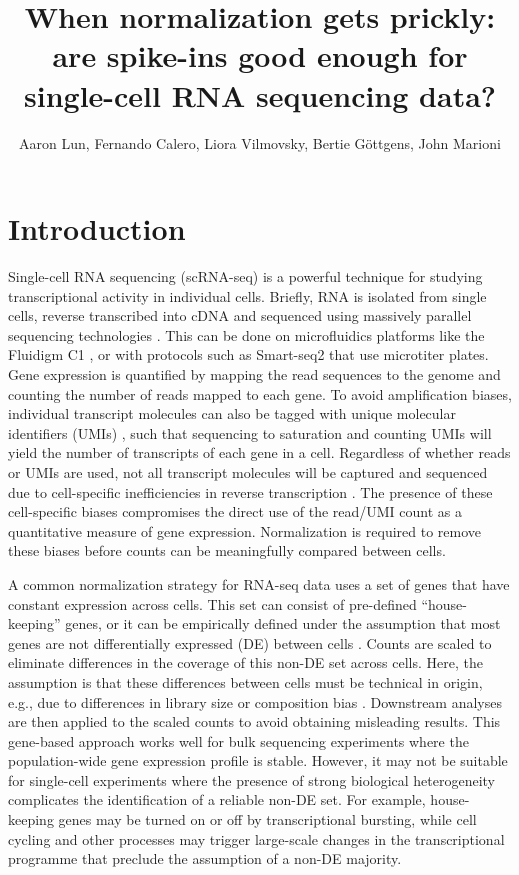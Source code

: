 \documentclass{article}
\title{When normalization gets prickly: are spike-ins good enough for single-cell RNA sequencing data?}
\author{Aaron Lun, Fernando Calero, Liora Vilmovsky, Bertie G\"ottgens, John Marioni}
\begin{document}
\maketitle

\section{Introduction}
Single-cell RNA sequencing (scRNA-seq) is a powerful technique for studying transcriptional activity in individual cells.
Briefly, RNA is isolated from single cells, reverse transcribed into cDNA and sequenced using massively parallel sequencing technologies \cite{shapiro2013singlecell}.
This can be done on microfluidics platforms like the Fluidigm C1 \cite{pollen2014lowcoverage}, or with protocols such as Smart-seq2 \cite{picelli2014full} that use microtiter plates.
Gene expression is quantified by mapping the read sequences to the genome and counting the number of reads mapped to each gene.
To avoid amplification biases, individual transcript molecules can also be tagged with unique molecular identifiers (UMIs) \cite{islam2014quantitative}, such that sequencing to saturation and counting UMIs will yield the number of transcripts of each gene in a cell.
Regardless of whether reads or UMIs are used, not all transcript molecules will be captured and sequenced due to cell-specific inefficiencies in reverse transcription \cite{stegle2015computational}.
The presence of these cell-specific biases compromises the direct use of the read/UMI count as a quantitative measure of gene expression.
Normalization is required to remove these biases before counts can be meaningfully compared between cells.

A common normalization strategy for RNA-seq data uses a set of genes that have constant expression across cells.
This set can consist of pre-defined ``house-keeping'' genes, or it can be empirically defined under the assumption that most genes are not differentially expressed (DE) between cells \cite{lun2016pooling,anders2010differential,robinson2010tmm}.
Counts are scaled to eliminate differences in the coverage of this non-DE set across cells.
Here, the assumption is that these differences between cells must be technical in origin, e.g., due to differences in library size or composition bias \cite{robinson2010tmm}.
Downstream analyses are then applied to the scaled counts to avoid obtaining misleading results.
This gene-based approach works well for bulk sequencing experiments where the population-wide gene expression profile is stable.
However, it may not be suitable for single-cell experiments where the presence of strong biological heterogeneity complicates the identification of a reliable non-DE set. 
For example, house-keeping genes may be turned on or off by transcriptional bursting, while cell cycling and other processes may trigger large-scale changes in the transcriptional programme that preclude the assumption of a non-DE majority.
\end{document}
